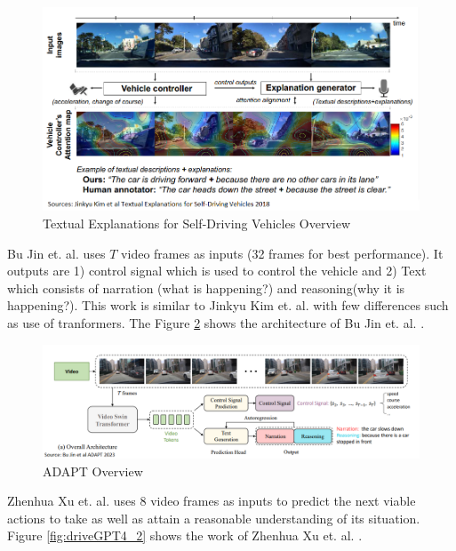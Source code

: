\begin{spacing}{1.5}
\begin{sloppypar}
\begin{figure}[h]
\begin{center}
\includegraphics[scale=0.8]{2/textual_1.png}
\caption{Textual Explanations for Self-Driving Vehicles Overview}
\label{fig:textual}
\end{center}
\end{figure}

Bu Jin et. al. \cite{jin2023adapt} uses $T$ video frames as inputs (32 frames for best performance). It outputs are 1) control signal which is used to control the vehicle and 2) Text which consists of narration (what is happening?) and reasoning(why it is happening?). This work is similar to Jinkyu Kim et. al. \cite{textual} with few differences such as use of tranformers. The Figure \ref{fig:adapt} shows the architecture of Bu Jin et. al. \cite{jin2023adapt}.

\begin{figure}[h]
\begin{center}
\includegraphics[scale=0.6]{2/ADAPT_1.png}
\caption{ADAPT Overview}
\label{fig:adapt}
\end{center}
\end{figure}

Zhenhua Xu et. al. \cite{xu2023drivegpt4} uses 8 video frames as inputs to predict the next viable actions to take as well as attain a reasonable understanding of its situation. Figure \ref{fig:driveGPT4_2} shows the work of Zhenhua Xu et. al. \cite{xu2023drivegpt4}.


\end{sloppypar}
\end{spacing}
